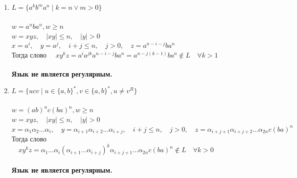 \documentclass{article}
\begin{document}
\begin{enumerate}
    \item {$L = \{ a^k b^m a^n \mid k = n \lor m > 0\} $}\\ \\
        $w = a^nba^n, w \geq n$ \\
        $w = xyz, \quad |xy| \leq n, \quad |y| > 0$ \\
        $x = a^i, \quad y = a^j, \quad i+j \leq n, \quad j > 0, \quad z = a^{n-i-j} b a^n$ \\
        Тогда слово $\quad x y^k z = a^i a^{jk} a^{n-i-j} b a^n = a^{n-j(k-1)} b a^n \notin L \quad \forall k > 1$ \\ \\
        \textbf{Язык не является регулярным.} \\
        
    \item {$L = \{ucv \mid u \in \{a, b\}^*, v \in \{a, b\}^*, u \neq v^R\} $}\\ \\
        $w = (ab)^n c (ba)^n, w \geq n$ \\
        $w = xyz, \quad |xy| \leq n, \quad |y| > 0$ \\
        $x = \alpha_1\alpha_2...\alpha_i, \quad y=\alpha_{i+1}\alpha_{i+2}...\alpha_{i+j}, \quad i+j \leq n, \quad j > 0, \quad z = \alpha_{i+j+1}\alpha_{i+j+2}...\alpha_{2n} c (ba)^n$ \\
        Тогда слово $\quad x y^k z = \alpha_1...\alpha_i(\alpha_{i+1}...\alpha_{i+j})^k \alpha_{i+j+1}...\alpha_{2n}c(ba)^n \notin L \quad \forall k > 0 $ \\ \\
        \textbf{Язык не является регулярным.} \\
        
        
\end{enumerate}
\end{document}
